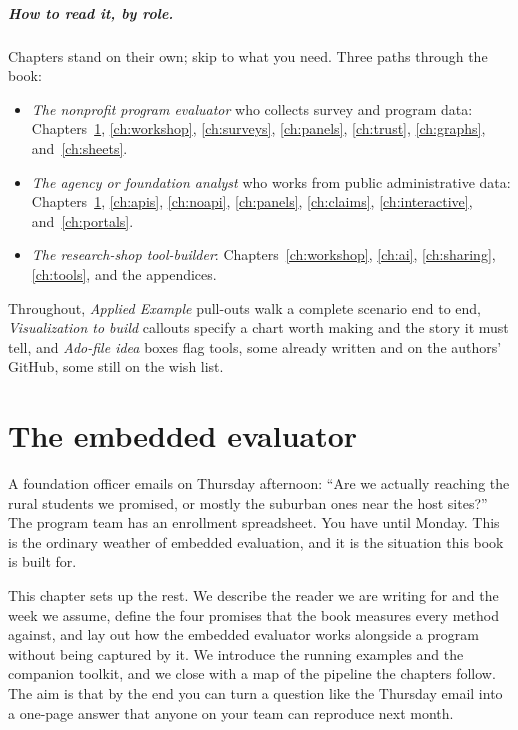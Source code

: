 \documentclass[
    a4paper,
    fontsize=10pt,
    twoside=true,
    numbers=noenddot,
]{kaobook}
\begin{document}
\paragraph{How to read it, by role.} Chapters stand on their own; skip to what you need. Three paths through the book:
\begin{itemize}
    \item \emph{The nonprofit program evaluator} who collects survey and program data: Chapters~\ref{ch:embedded}, \ref{ch:workshop}, \ref{ch:surveys}, \ref{ch:panels}, \ref{ch:trust}, \ref{ch:graphs}, and~\ref{ch:sheets}.
    \item \emph{The agency or foundation analyst} who works from public administrative data: Chapters~\ref{ch:embedded}, \ref{ch:apis}, \ref{ch:noapi}, \ref{ch:panels}, \ref{ch:claims}, \ref{ch:interactive}, and~\ref{ch:portals}.
    \item \emph{The research-shop tool-builder}: Chapters~\ref{ch:workshop}, \ref{ch:ai}, \ref{ch:sharing}, \ref{ch:tools}, and the appendices.
\end{itemize}
Throughout, \emph{Applied Example} pull-outs walk a complete scenario end to end, \emph{Visualization to build} callouts specify a chart worth making and the story it must tell, and \emph{Ado-file idea} boxes flag tools, some already written and on the authors' GitHub, some still on the wish list.



\chapter{The embedded evaluator}\label{ch:embedded}

A foundation officer emails on Thursday afternoon: \enquote{Are we actually reaching the rural students we promised, or mostly the suburban ones near the host sites?} The program team has an enrollment spreadsheet. You have until Monday. This is the ordinary weather of embedded evaluation, and it is the situation this book is built for.

This chapter sets up the rest. We describe the reader we are writing for and the week we assume, define the four promises that the book measures every method against, and lay out how the embedded evaluator works alongside a program without being captured by it. We introduce the running examples and the companion toolkit, and we close with a map of the pipeline the chapters follow. The aim is that by the end you can turn a question like the Thursday email into a one-page answer that anyone on your team can reproduce next month.
\end{document}
